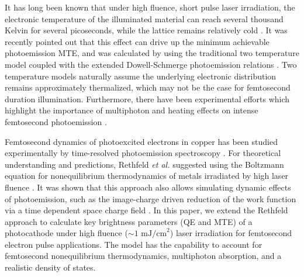 It has long been known that under high fluence, short pulse laser irradiation, the electronic temperature of the illuminated material can reach several thousand Kelvin for several picoseconds, while the lattice remains relatively cold \cite{Anisimov1974,Fann1993,Elsayed-Ali1987}. It was recently pointed out that this effect can drive up the minimum achievable photoemission MTE, and was calculated by using the traditional two temperature model coupled with the extended Dowell-Schmerge photoemission relations \cite{ttm}. Two temperature models naturally assume the underlying electronic distribution remains approximately thermalized, which may not be the case for femtosecond duration illumination. Furthermore, there have been experimental efforts which highlight the importance of multiphoton and heating effects on intense femtosecond photoemission \cite{Pasmans2016,An2018,Bartoli1997}.

Femtosecond dynamics of photoexcited electrons in copper has been studied experimentally by time-resolved photoemission spectroscopy \cite{Petek1999,Cao1997,Wolf1997}.
For theoretical understanding and predictions, Rethfeld \textit{et al.} suggested using the Boltzmann equation for nonequilibrium thermodynamics of metals irradiated by high laser fluence \cite{rethfeld,boltzmann,skin}.
It was shown that this approach also allows simulating dynamic effects of photoemission, such as the image-charge driven reduction of the work function via a time dependent space charge field \cite{rethfeld_schottky}.
In this paper, we extend the Rethfeld approach to calculate key brightness parameters (QE and MTE) of a photocathode under high fluence ($\sim 1 \textrm{ mJ/cm}^2$) laser irradiation for femtosecond electron pulse applications. The model has the capability to account for femtosecond nonequilibrium thermodynamics, multiphoton absorption, and a realistic density of states. 








